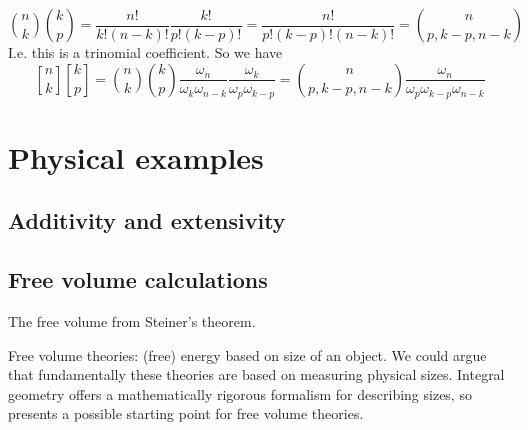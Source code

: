 \documentclass[11pt]{report}
\begin{document}
\begin{equation*}
  {n \choose k} {k \choose p}
  =
  \frac{n!}{k!(n-k)!}
  \frac{k!}{p!(k-p)!}
  =
  \frac{n!}{p!(k-p)!(n-k)!}
  =
  {n \choose p, k-p, n-k}
\end{equation*}
I.e. this is a trinomial coefficient.
So we have
\begin{equation*}
  {n \brack k} {k \brack p}
  =
  {n \choose k}
  {k \choose p}
  \frac{\omega_n}{\omega_k \omega_{n-k}}
  \frac{\omega_k}{\omega_p \omega_{k-p}}
  =
  {n \choose p, k-p, n-k}
  \frac{\omega_n}{\omega_p \omega_{k-p} \omega_{n-k}}
\end{equation*}

\section{Physical examples}

\subsection{Additivity and extensivity}

\subsection{Free volume calculations}

The free volume from Steiner's theorem.

Free volume theories: (free) energy based on size of an object.
We could argue that fundamentally these theories are based on measuring physical sizes.
Integral geometry offers a mathematically rigorous formalism for describing sizes, so presents a possible starting point for free volume theories.
\end{document}
